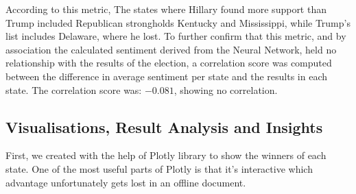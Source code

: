 \documentclass{article}
\begin{document}
  According to this metric, The states where Hillary found more
  support than Trump included Republican strongholds Kentucky and
  Mississippi, while Trump’s list includes Delaware, where he lost. To
  further confirm that this metric, and by association the calculated
  sentiment derived from the Neural Network, held no relationship with
  the results of the election, a correlation score was computed
  between the difference in average sentiment per state and the
  results in each state. The correlation score was: $-0.081$, showing no
  correlation.  

  \subsection{Visualisations, Result Analysis and Insights}


   \begin{wrapfigure}{r}{0.40\linewidth}
    \vspace{-20pt}
    \begin{center}
      \texttt{[image: \{winner\_states.jpeg]}}
    \end{center}
    \captionsetup{justification=centering}
    \caption{Majority Choice in Each State} 
    \label{fig:winner_states}
    \vspace{10pt}
  \end{wrapfigure}


  
  First, we created  with the help of Plotly library to
  show the winners of each state. One of the most useful parts of
  Plotly is that it’s interactive which advantage unfortunately gets
  lost in an offline document.  


  
\end{document}
